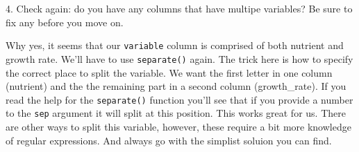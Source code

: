 \documentclass[]{book}
\newenvironment{Shaded}{\begin{snugshade}}{\end{snugshade}}
\newcommand{\CharTok}[1]{\textcolor[rgb]{0.31,0.60,0.02}{#1}}
\newcommand{\DataTypeTok}[1]{\textcolor[rgb]{0.13,0.29,0.53}{#1}}
\newcommand{\DecValTok}[1]{\textcolor[rgb]{0.00,0.00,0.81}{#1}}
\newcommand{\FloatTok}[1]{\textcolor[rgb]{0.00,0.00,0.81}{#1}}
\newcommand{\KeywordTok}[1]{\textcolor[rgb]{0.13,0.29,0.53}{\textbf{#1}}}
\newcommand{\NormalTok}[1]{#1}
\newcommand{\OperatorTok}[1]{\textcolor[rgb]{0.81,0.36,0.00}{\textbf{#1}}}
\newcommand{\StringTok}[1]{\textcolor[rgb]{0.31,0.60,0.02}{#1}}
\begin{document}
\begin{Shaded}
\end{Shaded}

4. Check again: do you have any columns that have multipe variables? Be sure to fix any before you move on.

Why yes, it seems that our \texttt{variable} column is comprised of both nutrient and growth rate. We'll have to use \texttt{separate()} again. The trick here is how to specify the correct place to split the variable. We want the first letter in one column (nutrient) and the the remaining part in a second column (growth\_rate). If you read the help for the \texttt{separate()} function you'll see that if you provide a number to the \texttt{sep} argument it will split at this position. This works great for us. There are other ways to split this variable, however, these require a bit more knowledge of regular expressions. And always go with the simplist soluion you can find.

\begin{Shaded}
\end{Shaded}
\end{document}
